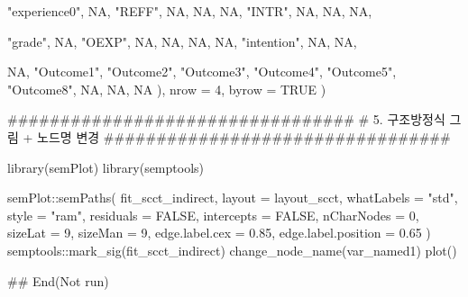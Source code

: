 \documentclass[a4paper]{book}
\begin{document}
\begin{Examples}
\begin{ExampleCode}
    "experience0", NA, "REFF", NA, NA,
        NA, "INTR", NA, NA, NA,

    "grade", NA, "OEXP", NA, NA,
        NA, NA, "intention", NA, NA,

    NA, "Outcome1", "Outcome2", "Outcome3", "Outcome4",
        "Outcome5", "Outcome8", NA, NA, NA
  ),
  nrow = 4,
  byrow = TRUE
)

#################################
# 5. 구조방정식 그림 + 노드명 변경
#################################

library(semPlot)
library(semptools)

semPlot::semPaths(
  fit_scct_indirect,
  layout        = layout_scct,
  whatLabels    = "std",
  style         = "ram",
  residuals     = FALSE,
  intercepts    = FALSE,
  nCharNodes    = 0,
  sizeLat       = 9,
  sizeMan       = 9,
  edge.label.cex = 0.85,
  edge.label.position = 0.65
) %
  semptools::mark_sig(fit_scct_indirect) %
  change_node_name(var_named1) %
  plot()


## End(Not run)
\end{ExampleCode}
\end{Examples}
\end{document}
